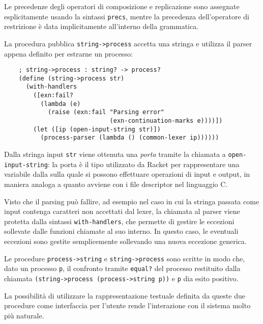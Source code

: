 Le precedenze degli operatori di composizione e replicazione sono
assegnate esplicitamente usando la sintassi \lstinline{precs}, mentre
la precedenza dell'operatore di restrizione \`e data implicitamente
all'interno della grammatica.

La procedura pubblica \lstinline{string->process} accetta una stringa
e utilizza il parser appena definito per estrarne un processo:

\begin{lstlisting}
    ; string->process : string? -> process?
    (define (string->process str)
      (with-handlers
        ([exn:fail?
          (lambda (e)
            (raise (exn:fail "Parsing error"
                             (exn-continuation-marks e))))])
        (let ([ip (open-input-string str)])
          (process-parser (lambda () (common-lexer ip))))))
\end{lstlisting}

Dalla stringa input \lstinline{str} viene ottenuta una \emph{porta}
tramite la chiamata a \lstinline{open-input-string}: la porta \`e il
tipo utilizzato da Racket per rappresentare una variabile dalla sulla
quale si possono effettuare operazioni di input e output, in maniera
analoga a quanto avviene con i file descriptor nel linguaggio C.

Visto che il parsing pu\`o fallire, ad esempio nel caso in cui la
stringa passata come input contenga caratteri non accettati dal lexer,
la chiamata al parser viene protetta dalla sintassi
\lstinline{with-handlers}, che permette di gestire le eccezioni
sollevate dalle funzioni chiamate al suo interno. In questo caso,
le eventuali eccezioni sono gestite semplicemente sollevando una
nuova eccezione generica.

Le procedure \lstinline{process->string} e \lstinline{string->process}
sono scritte in modo che, dato un processo \lstinline{p}, il confronto
tramite \lstinline{equal?} del processo restituito dalla chiamata
\lstinline{(string->process (process->string p))} e \lstinline{p} dia
esito positivo.

La possibilit\`a di utilizzare la rappresentazione testuale definita
da queste due procedure come interfaccia per l'utente rende
l'interazione con il sistema molto pi\`u naturale.
